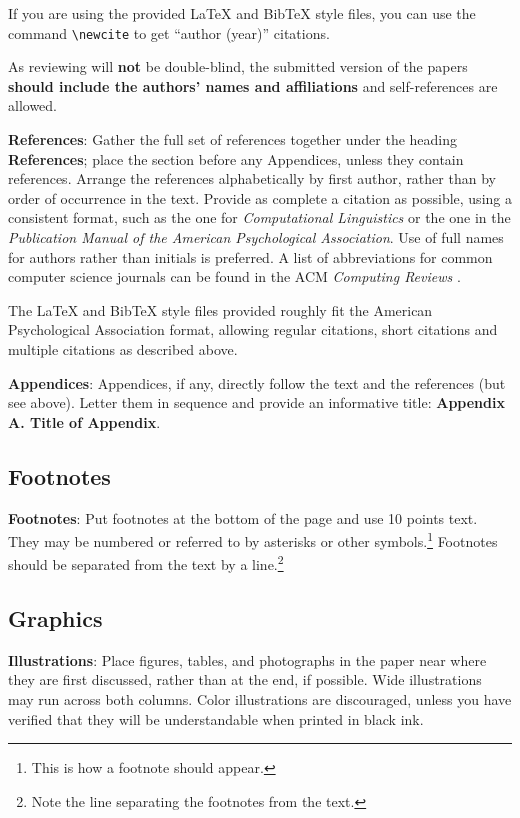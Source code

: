 \documentclass[11pt]{article}
\begin{document}
If you are using the provided \LaTeX{} and Bib\TeX{} style files, you
can use the command \verb|\newcite| to get ``author (year)'' citations.

As reviewing will {\bf not} be double-blind, the submitted version of the 
papers {\bf should include the authors' names and affiliations} and self-references 
are allowed.

\textbf{References}: Gather the full set of references together under
the heading {\bf References}; place the section before any Appendices,
unless they contain references. Arrange the references alphabetically
by first author, rather than by order of occurrence in the text.
Provide as complete a citation as possible, using a consistent format,
such as the one for {\em Computational Linguistics\/} or the one in the 
{\em Publication Manual of the American 
Psychological Association\/}.  Use of full names for
authors rather than initials is preferred.  A list of abbreviations for common computer science journals can be found in the ACM 
{\em Computing Reviews} .

The \LaTeX{} and Bib\TeX{} style files provided roughly fit the
American Psychological Association format, allowing regular citations, 
short citations and multiple citations as described above.

{\bf Appendices}: Appendices, if any, directly follow the text and the
references (but see above).  Letter them in sequence and provide an
informative title: {\bf Appendix A. Title of Appendix}.

\subsection{Footnotes}

{\bf Footnotes}: Put footnotes at the bottom of the page and use 10
points text. They may be numbered or referred to by asterisks or other
symbols.\footnote{This is how a footnote should appear.} Footnotes
should be separated from the text by a line.\footnote{Note the line
separating the footnotes from the text.}

\subsection{Graphics}

{\bf Illustrations}: Place figures, tables, and photographs in the
paper near where they are first discussed, rather than at the end, if
possible.  Wide illustrations may run across both columns.  Color
illustrations are discouraged, unless you have verified that  
they will be understandable when printed in black ink.
\end{document}
